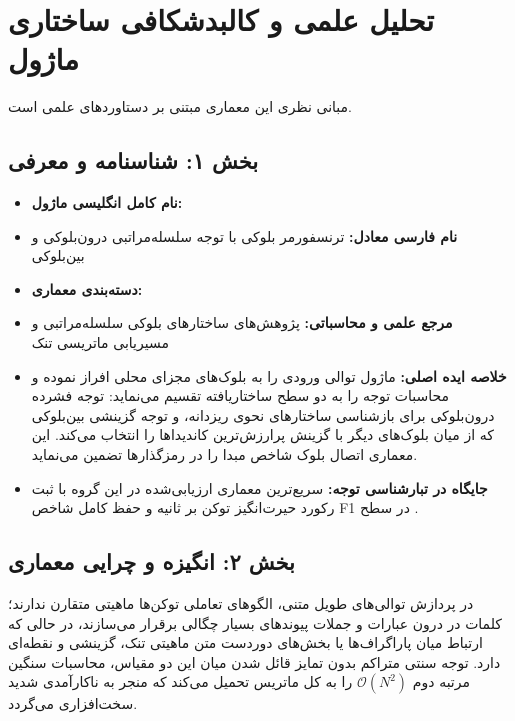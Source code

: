 \section{تحلیل علمی و کالبدشکافی ساختاری ماژول }

مبانی نظری این معماری مبتنی بر دستاوردهای علمی \cite{vaswani2017attention} است.
\label{sec:block_transformer_hiba}

\subsection*{بخش ۱: شناسنامه و معرفی }
\begin{itemize}
    \item \textbf{نام کامل انگلیسی ماژول:} 
    \item \textbf{نام فارسی معادل:} ترنسفورمر بلوکی با توجه سلسله‌مراتبی درون‌بلوکی و بین‌بلوکی 
    \item \textbf{دسته‌بندی معماری:} 
    \item \textbf{مرجع علمی و محاسباتی:} پژوهش‌های ساختارهای بلوکی سلسله‌مراتبی و مسیریابی ماتریسی تنک 
    \item \textbf{خلاصه ایده اصلی:} ماژول  توالی ورودی را به بلوک‌های مجزای محلی افراز نموده و محاسبات توجه را به دو سطح ساختاریافته تقسیم می‌نماید: توجه فشرده درون‌بلوکی  برای بازشناسی ساختارهای نحوی ریزدانه، و توجه گزینشی بین‌بلوکی  که از میان بلوک‌های دیگر با گزینش  پرارزش‌ترین کاندیداها را انتخاب می‌کند. این معماری اتصال بلوک شاخص مبدا  را در رمزگذارها تضمین می‌نماید.
    \item \textbf{جایگاه در تبارشناسی توجه:} سریع‌ترین معماری ارزیابی‌شده در این گروه با ثبت رکورد حیرت‌انگیز  توکن بر ثانیه و حفظ کامل شاخص F1 در سطح .
\end{itemize}

\subsection*{بخش ۲: انگیزه و چرایی معماری }
در پردازش توالی‌های طویل متنی، الگوهای تعاملی توکن‌ها ماهیتی متقارن ندارند؛ کلمات در درون عبارات و جملات پیوندهای بسیار چگالی برقرار می‌سازند، در حالی که ارتباط میان پاراگراف‌ها یا بخش‌های دوردست متن ماهیتی تنک، گزینشی و نقطه‌ای دارد. توجه سنتی متراکم بدون تمایز قائل شدن میان این دو مقیاس، محاسبات سنگین مرتبه دوم $\mathcal{O}(N^2)$ را به کل ماتریس تحمیل می‌کند که منجر به ناکارآمدی شدید سخت‌افزاری می‌گردد.

